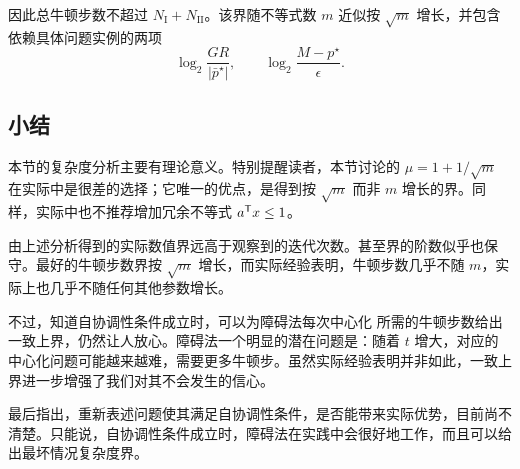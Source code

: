 因此总牛顿步数不超过 $N_{\mathrm I}+N_{\mathrm{II}}$。该界随不等式数 $m$ 近似按 $\sqrt m$ 增长，并包含依赖具体问题实例的两项
\[
\log_2\frac{GR}{|\bar p^\star|},\qquad\log_2\frac{M-p^\star}{\epsilon}.
\]

\subsection{小结}
本节的复杂度分析主要有理论意义。特别提醒读者，本节讨论的 $\mu=1+1/\sqrt m$ 在实际中是很差的选择；它唯一的优点，是得到按 $\sqrt m$ 而非 $m$ 增长的界。同样，实际中也不推荐增加冗余不等式 $a^\mathsf T x\le1$。

由上述分析得到的实际数值界远高于观察到的迭代次数。甚至界的阶数似乎也保守。最好的牛顿步数界按 $\sqrt m$ 增长，而实际经验表明，牛顿步数几乎不随 $m$，实际上也几乎不随任何其他参数增长。

不过，知道自协调性条件成立时，可以为障碍法每次中心化
所需的牛顿步数给出一致上界，仍然让人放心。障碍法一个明显的潜在问题是：随着 $t$ 增大，对应的中心化问题可能越来越难，需要更多牛顿步。虽然实际经验表明并非如此，一致上界进一步增强了我们对其不会发生的信心。

最后指出，重新表述问题使其满足自协调性条件，是否能带来实际优势，目前尚不清楚。只能说，自协调性条件成立时，障碍法在实践中会很好地工作，而且可以给出最坏情况复杂度界。
